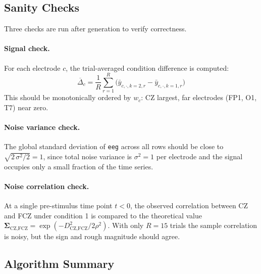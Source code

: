 \documentclass[12pt, a4paper]{article}
\begin{document}
\subsection{Sanity Checks}\label{sec:sanity}

Three checks are run after generation to verify correctness.

\paragraph{Signal check.}
For each electrode $c$, the trial-averaged condition difference is computed:
\[
  \overline{\Delta}_c
    = \frac{1}{R}\sum_{r=1}^{R}
      \bigl(\bar{y}_{c,\cdot,k=2,r} - \bar{y}_{c,\cdot,k=1,r}\bigr)
\]
This should be monotonically ordered by $w_c$: CZ largest,
far electrodes (FP1, O1, T7) near zero.

\paragraph{Noise variance check.}
The global standard deviation of \texttt{eeg} across all rows should be
close to $\sqrt{2\,\sigma^2/2} = 1$, since total noise variance is
$\sigma^2 = 1$ per electrode and the signal occupies only a small
fraction of the time series.

\paragraph{Noise correlation check.}
At a single pre-stimulus time point $t < 0$, the observed correlation
between CZ and FCZ under condition 1 is compared to the theoretical value
$\boldsymbol{\Sigma}_\text{CZ,FCZ} = \exp(-D_\text{CZ,FCZ}^2 / 2\rho^2)$.
With only $R = 15$ trials the sample correlation is noisy, but the sign
and rough magnitude should agree.

\subsection{Algorithm Summary}\label{sec:alg_summary}
\end{document}
